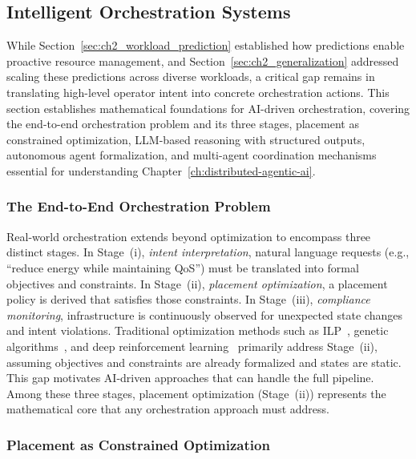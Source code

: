 \subsection{Intelligent Orchestration Systems}
\label{sec:ch2_intelligent_orchestration}

While Section~\ref{sec:ch2_workload_prediction} established how predictions enable proactive resource management, and Section~\ref{sec:ch2_generalization} addressed scaling these predictions across diverse workloads, a critical gap remains in translating high-level operator intent into concrete orchestration actions. This section establishes mathematical foundations for AI-driven orchestration, covering the end-to-end orchestration problem and its three stages, placement as constrained optimization, \ac{LLM}-based reasoning with structured outputs, autonomous agent formalization, and multi-agent coordination mechanisms essential for understanding Chapter~\ref{ch:distributed-agentic-ai}.

\subsubsection{The End-to-End Orchestration Problem}

Real-world orchestration extends beyond optimization to encompass three distinct stages. In Stage~(i), \textit{intent interpretation}, natural language requests (e.g., ``reduce energy while maintaining \ac{QoS}'') must be translated into formal objectives and constraints. In Stage~(ii), \textit{placement optimization}, a placement policy is derived that satisfies those constraints. In Stage~(iii), \textit{compliance monitoring}, infrastructure is continuously observed for unexpected state changes and intent violations. Traditional optimization methods such as \ac{ILP}~\cite{margot2009symmetry}, genetic algorithms~\cite{holland1992genetic}, and deep reinforcement learning~\cite{li2017deep} primarily address Stage~(ii), assuming objectives and constraints are already formalized and states are static. This gap motivates AI-driven approaches that can handle the full pipeline. Among these three stages, placement optimization (Stage~(ii)) represents the mathematical core that any orchestration approach must address.

\subsubsection{Placement as Constrained Optimization}

